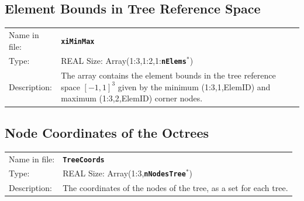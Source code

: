 \documentclass[a4paper,headsepline]{scrreprt}
\newcommand\ttbf[1]{\texttt{\textbf{#1}}}
\newcommand\nElems{\ttbf{nElems}\xspace}
\newcommand\nNodesTree{\ttbf{nNodesTree}\xspace}
\begin{document}
\subsection{Element Bounds in Tree Reference Space}
\begin{tabularx}{1.0\textwidth}{lX}
Name in  file: & \textbf{\texttt{xiMinMax}}\\
Type:         & REAL \quad Size: Array(1:3,1:2,1:\nElems$^*$) \\
Description:  & The array contains the element bounds in the tree reference space $[-1,1]^3$ given by the minimum (1:3,1,ElemID) and maximum (1:3,2,ElemID) corner nodes. \\
\end{tabularx}


\subsection{Node Coordinates of the Octrees}
\begin{tabularx}{1.0\textwidth}{lX}
Name in  file: & \textbf{\texttt{TreeCoords}}\\
Type:         & REAL \quad Size: Array(1:3,\nNodesTree$^*$) \\
Description:  & The coordinates of the nodes of the tree, as a set for each tree. \\
\end{tabularx}



%
\end{document}
